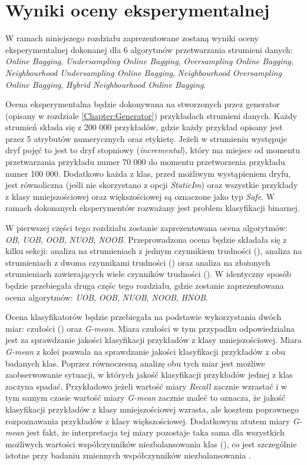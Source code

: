 \chapter{Wyniki oceny eksperymentalnej}
\label{Section:Results}

\noindent W ramach niniejszego rozdziału zaprezentowane zostaną wyniki oceny eksperymentalnej dokonanej dla 6 algorytmów przetwarzania strumieni danych: \textit{Online Bagging}, \textit{Undersampling Online Bagging}, \textit{Oversampling Online Bagging}, \textit{Neighbourhood Undersampling Online Bagging}, \textit{Neighbourhood Oversampling Online Bagging}, \textit{Hybrid Neighbourhood Online Bagging}.

Ocena eksperymentalna będzie dokonywana na stworzonych przez generator (opisany w rozdziale \ref{Chapter:Generator}) przykładach strumieni danych. Każdy strumień składa się z 200 000 przykładów, gdzie każdy przykład opisany jest przez 5 atrybutów numerycznych oraz etykietę. Jeżeli w strumieniu występuje dryf pojęć to jest to dryf stopniowy (\textit{incremental}), który ma miejsce od momentu przetwarzania przykładu numer 70 000 do momentu przetworzenia przykładu numer 100 000. Dodatkowo każda z klas, przed możliwym wystąpieniem dryfu, jest równoliczna (jeśli nie skorzystano z opcji \textit{StaticIm}) oraz wszystkie przykłady z klasy mniejszościowej oraz większościowej są oznaczone jako typ \textit{Safe}. W ramach dokonanych eksperymentów rozważany jest problem klasyfikacji binarnej.

W pierwszej części tego rozdziału zostanie zaprezentowana ocena algorytmów: \textit{OB}, \textit{UOB}, \textit{OOB}, \textit{NUOB}, \textit{NOOB}. Przeprowadzona ocena będzie składała się z kilku sekcji: analiza na strumieniach z jednym czynnikiem trudności (), analiza na strumieniach z dwoma czynnikami trudności () oraz analiza na złożonych strumieniach zawierających wiele czynników trudności (). W identyczny sposób będzie przebiegała druga częśc tego rozdziału, gdzie zostanie zaprezentowana ocena algorytmów: \textit{UOB}, \textit{OOB}, \textit{NUOB}, \textit{NOOB}, \textit{HNOB}.

Ocena klasyfikatorów będzie przebiegała na podstawie wykorzystania dwóch miar: czułości () oraz \textit{G-mean}. Miara czułości w tym przypadku odpowiedzialna jest za sprawdzanie jakości klasyfikacji przykładów z klasy mniejszościowej. Miara \textit{G-mean} z kolei pozwala na sprawdzanie jakości klasyfikacji przykładów z obu badanych klas. Poprzez równoczesną analizę obu tych miar jest możliwe zaobserwowanie sytuacji, w których jakość klasyfikacji przykładów jednej z klas zaczyna spadać. Przykładowo jeżeli wartość miary \textit{Recall} zacznie wzrastać i w tym samym czasie wartość miary \textit{G-mean} zacznie maleć to oznacza, że jakość klasyfikacji przykładów z klasy mniejszościowej wzrasta, ale kosztem poprawnego rozpoznawania przykładów z klasy większościowej. Dodatkowym atutem miary \textit{G-mean} jest fakt, że interpretacja tej miary pozostaje taka sama dla wszystkich możliwych wartości współczynników niezbalansowania klas (), co jest szczególnie istotne przy badaniu zmiennych współczynników niezbalansowania \cite{Article:TypyPrzykladow}.

